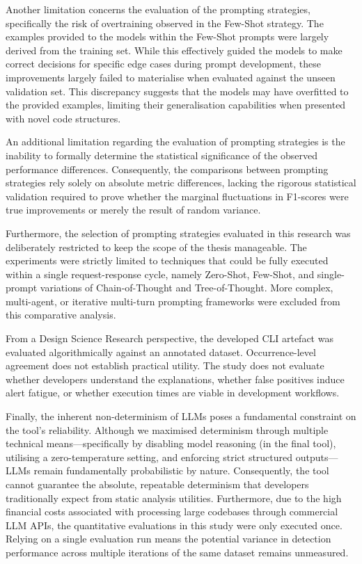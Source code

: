 Another limitation concerns the evaluation of the prompting strategies, specifically the risk of overtraining observed in the Few-Shot strategy. The examples provided to the models within the Few-Shot prompts were largely derived from the training set. While this effectively guided the models to make correct decisions for specific edge cases during prompt development, these improvements largely failed to materialise when evaluated against the unseen validation set. This discrepancy suggests that the models may have overfitted to the provided examples, limiting their generalisation capabilities when presented with novel code structures.

An additional limitation regarding the evaluation of prompting strategies is the inability to formally determine the statistical significance of the observed performance differences. Consequently, the comparisons between prompting strategies rely solely on absolute metric differences, lacking the rigorous statistical validation required to prove whether the marginal fluctuations in F1-scores were true improvements or merely the result of random variance.

Furthermore, the selection of prompting strategies evaluated in this research was deliberately restricted to keep the scope of the thesis manageable. The experiments were strictly limited to techniques that could be fully executed within a single request-response cycle, namely Zero-Shot, Few-Shot, and single-prompt variations of Chain-of-Thought and Tree-of-Thought. More complex, multi-agent, or iterative multi-turn prompting frameworks were excluded from this comparative analysis.

From a Design Science Research perspective, the developed CLI artefact was evaluated algorithmically against an annotated dataset. Occurrence-level agreement does not establish practical utility. The study does not evaluate whether developers understand the explanations, whether false positives induce alert fatigue, or whether execution times are viable in development workflows.

Finally, the inherent non-determinism of LLMs poses a fundamental constraint on the tool's reliability. Although we maximised determinism through multiple technical means—specifically by disabling model reasoning (in the final tool), utilising a zero-temperature setting, and enforcing strict structured outputs—LLMs remain fundamentally probabilistic by nature. Consequently, the tool cannot guarantee the absolute, repeatable determinism that developers traditionally expect from static analysis utilities. Furthermore, due to the high financial costs associated with processing large codebases through commercial LLM APIs, the quantitative evaluations in this study were only executed once. Relying on a single evaluation run means the potential variance in detection performance across multiple iterations of the same dataset remains unmeasured.

